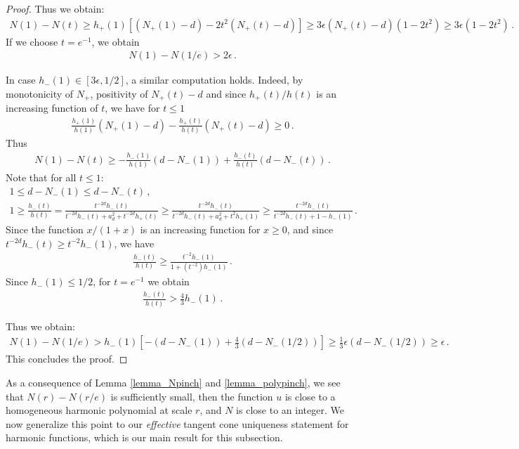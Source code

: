 \documentclass[11pt]{article}
\begin{document}
\begin{proof}
Thus we obtain:
\begin{gather}
 N(1)-N(t)\geq  h_+(1) {\left[{(N_+(1)-d) -2t^2(N_+(t)-d)}\right]} \geq 3\epsilon (N_+(t)-d)(1-2t^2)\geq 3\epsilon (1-2t^2)\, .
\end{gather}
If we choose $t=e^{-1}$, we obtain
\begin{gather}
 N(1)- N(1/e)>  2\epsilon\, .
\end{gather}

In case $h_-(1)\in [3\epsilon,1/2]$, a similar computation holds. Indeed, by monotonicity of $N_+$, positivity of $N_+(t)-d$ and since $h_+(t)/h(t)$ is an increasing function of $t$, we have for $t\leq 1$
\begin{gather}
 \frac{h_+(1)}{h(1)} {\left({N_+(1)-d}\right)} - \frac{h_+(t)}{h(t)} {\left({N_+(t)-d}\right)} \geq 0\, .
\end{gather}
Thus
\begin{gather}
 N(1)- N(t)\geq  -\frac{h_-(1)}{h(1)}(d-N_-(1)) +\frac{h_-(t)}{h(t)}(d-N_-(t)) \, .
\end{gather}
Note that for all $t\leq 1$:
\begin{gather}
1\leq d-N_-(1)\leq d-N_-(t)\, ,\\
1\geq\frac{h_-(t)}{h(t)} = \frac{t^{-2d}h_-(t)}{t^{-2d}h_-(t) + a_d^2 + t^{-2d} h_+(t)} \geq \frac{t^{-2d} h_-(t)}{t^{-2d}h_-(t) + a_d^2 +t^2 h_+(1)} \geq \frac{t^{-2d} h_-(t)}{t^{-2d}h_-(t) + 1-h_-(1)} \, .
\end{gather}
Since the function $x/(1+x)$ is an increasing function for $x\geq 0$, and since $t^{-2d} h_-(t) \geq t^{-2} h_-(1)$, we have
\begin{gather}
\frac{h_-(t)}{h(t)} \geq \frac{t^{-2} h_-(1)}{1 + (t^{-2})h_-(1)} \, .
\end{gather}
Since $h_-(1)\leq 1/2$, for $t=e^{-1}$ we obtain
\begin{gather}
\frac{h_-(t)}{h(t)} >  \frac 4 3 h_-(1)\, .
\end{gather}

Thus we obtain:
\begin{gather}
 N(1)-N(1/e)> h_-(1) {\left[{-(d-N_-(1)) +\frac 4 3 (d-N_-(1/2))}\right]}\geq \frac 1 3 \epsilon (d-N_-(1/2))\geq\epsilon \, .
\end{gather}
This concludes the proof.
\end{proof}
As a consequence of Lemma \ref{lemma_Npinch} and \ref{lemma_polypinch}, we see that $N(r)-N(r/e)$ is sufficiently small, then the function $u$ is close to a homogeneous harmonic polynomial at scale $r$, and $N$ is close to an integer.  We now generalize this point to our {\it effective} tangent cone uniqueness statement for harmonic functions, which is our main result for this subsection. 
\end{document}
